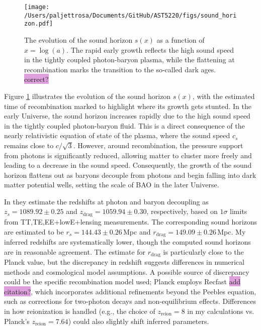 \documentclass{aa}
\numberwithin{equation}{section}
\numberwithin{table}{section}
\numberwithin{figure}{section}
\begin{document}


\begin{figure}
  \centering
  \texttt{[image: /Users/paljettrosa/Documents/GitHub/AST5220/figs/sound\_horizon.pdf]}
  \caption{The evolution of the sound horizon $s(x)$ as a function of $x = \log(a)$. The rapid early growth reflects the high sound speed in the tightly coupled photon-baryon plasma, while the flattening at recombination marks the transition to the so-called dark ages. \colorbox{Plum}{correct?}}\label{fig:sound horizon}
\end{figure}

Figure \ref{fig:sound horizon} illustrates the evolution of the sound horizon $s(x)$, with the estimated time of recombination marked to highlight where its growth gets stunted. In the early Universe, the sound horizon increases rapidly due to the high sound speed in the tightly coupled photon-baryon fluid. This is a direct consequence of the nearly relativistic equation of state of the plasma, where the sound speed $c_s$ remains close to $c/\sqrt{3}$. However, around recombination, the pressure support from photons is significantly reduced, allowing matter to cluster more freely and leading to a decrease in the sound speed. Consequently, the growth of the sound horizon flattens out as baryons decouple from photons and begin falling into dark matter potential wells, setting the scale of BAO in the later Universe.

In \cite{Planck} they estimate the redshifts at photon and baryon decoupling as $z_s = 1089.92\pm0.25$ and $z_\text{drag} = 1059.94\pm0.30$, respectively, based on $1\sigma$ limits from TT,TE,EE+lowE+lensing measurements. The corresponding sound horizons are estimated to be $r_s = 144.43\pm0.26\,$Mpc and $r_\text{drag} = 149.09\pm0.26\,$Mpc. My inferred redshifts are systematically lower, though the computed sound horizons are in reasonable agreement. The estimate for $r_\text{drag}$ is particularly close to the Planck value, but the discrepancy in redshift suggests differences in numerical methods and cosmological model assumptions. A possible source of discrepancy could be the specific recombination model used; Planck employs Recfast \colorbox{Plum}{add citation?}, which incorporates additional refinements beyond the Peebles equation, such as corrections for two-photon decays and non-equilibrium effects. Differences in how reionization is handled (e.g., the choice of $z_\text{reion} = 8$ in my calculations vs. Planck's $z_\text{reion} = 7.64$) could also slightly shift inferred parameters. 
\end{document}
